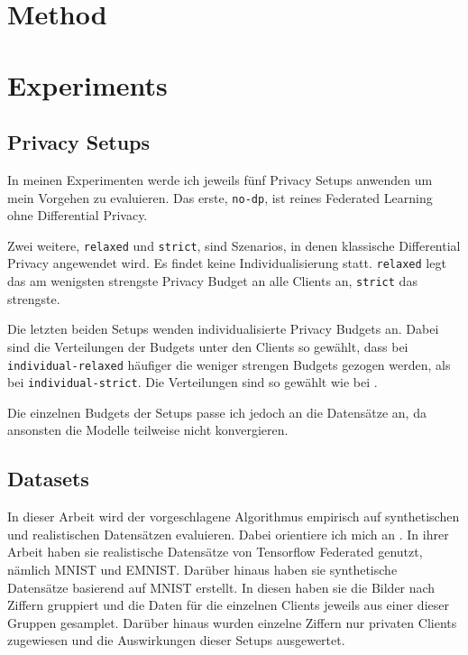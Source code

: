 \chapter{Method}

\chapter{Experiments}

\section{Privacy Setups}
In meinen Experimenten werde ich jeweils fünf Privacy Setups anwenden um mein Vorgehen zu evaluieren. Das erste, \texttt{no-dp}, ist reines Federated Learning ohne Differential Privacy. 

Zwei weitere, \texttt{relaxed} und \texttt{strict}, sind Szenarios, in denen klassische Differential Privacy angewendet wird. Es findet keine Individualisierung statt. \texttt{relaxed} legt das am wenigsten strengste Privacy Budget an alle Clients an, \texttt{strict} das strengste.

Die letzten beiden Setups wenden individualisierte Privacy Budgets an. Dabei sind die Verteilungen der Budgets unter den Clients so gewählt, dass bei \texttt{individual-relaxed} häufiger die weniger strengen Budgets gezogen werden, als bei \texttt{individual-strict}. Die Verteilungen sind so gewählt wie bei \textcite[p. 8]{boenisch:2023}.

Die einzelnen Budgets der Setups passe ich jedoch an die Datensätze an, da ansonsten die Modelle teilweise nicht konvergieren.

\section{Datasets}

In dieser Arbeit wird der vorgeschlagene Algorithmus empirisch auf synthetischen und realistischen Datensätzen evaluieren. Dabei orientiere ich mich an \textcite{aldaghri:2023}. In ihrer Arbeit haben sie realistische Datensätze von Tensorflow Federated genutzt, nämlich MNIST und EMNIST. Darüber hinaus haben sie synthetische Datensätze basierend auf MNIST erstellt. In diesen haben sie die Bilder nach Ziffern gruppiert und die Daten für die einzelnen Clients jeweils aus einer dieser Gruppen gesamplet. Darüber hinaus wurden einzelne Ziffern nur privaten Clients zugewiesen und die Auswirkungen dieser Setups ausgewertet.

